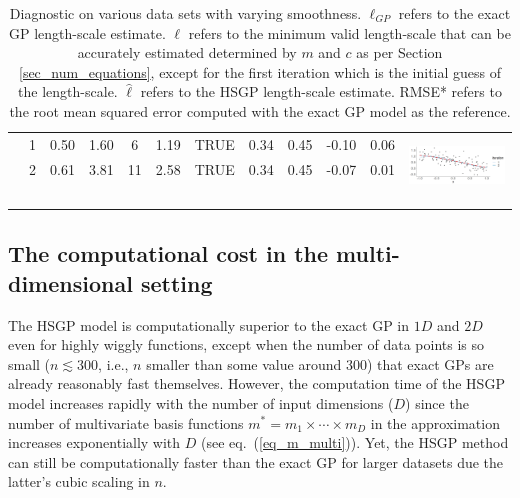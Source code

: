 \begin{table}
\begin{tabular}{ c c c c c c c c c c | c c}
 & 1 & 0.50 & 1.60 & 6 & 1.19 & TRUE & 0.34 & 0.45 & -0.10 & 0.06 & \multirow{6}{*}{ \includegraphics[scale=0.25, trim = 0mm 10mm 0mm 3mm, clip]{tab1_diagnostic_8.png}}\\
 & 2 & 0.61 & 3.81 & 11 & 2.58 & TRUE & 0.34 & 0.45 & -0.07 & 0.01 & \\
 \\
 \\
 \\
 \\[1mm]
\arrayrulecolor{gray}\hline
\end{tabular}
\caption{Diagnostic on various data sets with varying smoothness. $\ell_{GP}$ refers to the exact GP length-scale estimate. $\ell$ refers to the minimum valid length-scale that can be accurately estimated determined by $m$ and $c$ as per Section \ref{sec_num_equations}, except for the first iteration which is the initial guess of the length-scale. $\hat{\ell}$ refers to the HSGP length-scale estimate. RMSE* refers to the root mean squared error computed with the exact GP model as the reference.}
  \label{tab1_diagnostic}
\end{table}


\subsection{The computational cost in the multi-dimensional setting}\label{sec_cost_multi}

The HSGP model is computationally superior to the exact GP in $1D$ and $2D$ even for highly wiggly functions, except when the number of data points is so small ($n \lesssim 300$, i.e., $n$ smaller than some value around 300) that exact GPs are already reasonably fast themselves. However, the computation time of the HSGP model increases rapidly with the number of input dimensions ($D$) since the number of multivariate basis functions $m^*=m_1\times \cdots \times m_D$ in the approximation increases exponentially with $D$ (see eq.~(\ref{eq_m_multi})). Yet, the HSGP method can still be computationally faster than the exact GP for larger datasets due the latter's cubic scaling in $n$. 

